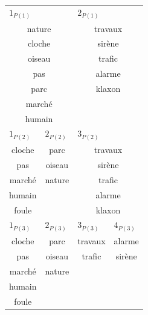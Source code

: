 \begin{table}[t]
\centering
\tiny
\begin{tabular}{c|c|c|c|c|c|c}
\multicolumn{3}{l|}{$1_{P(1)}$}  & \multicolumn{4}{l}{$2_{P(1)}$} \\
\multicolumn{3}{c|}{nature}      & \multicolumn{4}{c}{travaux} \\
\multicolumn{3}{c|}{cloche}      & \multicolumn{4}{c}{sirène} \\
\multicolumn{3}{c|}{oiseau}      & \multicolumn{4}{c}{trafic} \\
\multicolumn{3}{c|}{pas}         & \multicolumn{4}{c}{alarme} \\
\multicolumn{3}{c|}{parc}        & \multicolumn{4}{c}{klaxon} \\          
\multicolumn{3}{c|}{marché}      & \multicolumn{4}{c}{} \\   
\multicolumn{3}{c|}{humain}      & \multicolumn{4}{c}{} \\                                    
\hline
\multicolumn{2}{l|}{$1_{P(2)}$}  & \multicolumn{1}{l|}{$2_{P(2)}$} & \multicolumn{4}{l}{$3_{P(2)}$} \\
\multicolumn{2}{c|}{cloche}      & parc   & \multicolumn{4}{c}{travaux} \\
\multicolumn{2}{c|}{pas}         & oiseau  & \multicolumn{4}{c}{sirène} \\
\multicolumn{2}{c|}{marché}      & nature & \multicolumn{4}{c}{trafic} \\
\multicolumn{2}{c|}{humain}      &        & \multicolumn{4}{c}{alarme} \\	
\multicolumn{2}{c|}{foule}       &        & \multicolumn{4}{c}{klaxon} \\	
\hline
\multicolumn{2}{l|}{$1_{P(3)}$}  & \multicolumn{1}{l|}{$2_{P(3)}$} & \multicolumn{3}{l|}{$3_{P(3)}$} & \multicolumn{1}{l}{$4_{P(3)}$} \\ 
\multicolumn{2}{c|}{cloche}      & parc     & \multicolumn{3}{c|}{travaux}      & alarme \\         
\multicolumn{2}{c|}{pas}         & oiseau   & \multicolumn{3}{c|}{trafic}       & sirène\\ 
\multicolumn{2}{c|}{marché}      & nature   & \multicolumn{3}{c|}{}             &  \\ 
\multicolumn{2}{c|}{humain}      &          & \multicolumn{3}{c|}{}             &  \\            
\multicolumn{2}{c|}{foule}       &          & \multicolumn{3}{c|}{}             &  \\      

\end{tabular}
\end{table}
